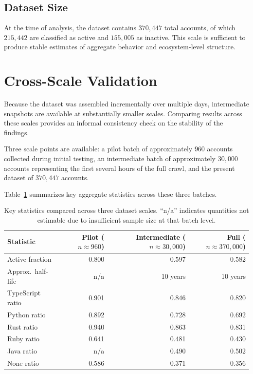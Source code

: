 \documentclass[12pt,a4paper]{article}
\begin{document}
\subsection{Dataset Size}

At the time of analysis, the dataset contains $370{,}447$ total accounts, of which $215{,}442$ are classified as active and $155{,}005$ as inactive. This scale is sufficient to produce stable estimates of aggregate behavior and ecosystem-level structure.

\section{Cross-Scale Validation}
\label{sec:crossscale}

Because the dataset was assembled incrementally over multiple days, intermediate snapshots are available at substantially smaller scales. Comparing results across these scales provides an informal consistency check on the stability of the findings.

Three scale points are available: a pilot batch of approximately $960$ accounts collected during initial testing, an intermediate batch of approximately $30{,}000$ accounts representing the first several hours of the full crawl, and the present dataset of $370{,}447$ accounts.

Table~\ref{tab:crossscale} summarizes key aggregate statistics across these three batches.

\begin{table}[h]
\centering
\begin{tabular}{lrrr}
\toprule
Statistic & Pilot ($n \approx 960$) & Intermediate ($n \approx 30{,}000$) & Full ($n \approx 370{,}000$) \\
\midrule
Active fraction       & 0.800 & 0.597 & 0.582 \\
Approx.\ half-life    & n/a   & 10 years & 10 years \\
TypeScript ratio      & 0.901 & 0.846 & 0.820 \\
Python ratio          & 0.892 & 0.728 & 0.692 \\
Rust ratio            & 0.940 & 0.863 & 0.831 \\
Ruby ratio            & 0.641 & 0.481 & 0.430 \\
Java ratio            & n/a   & 0.490 & 0.502 \\
None ratio            & 0.586 & 0.371 & 0.356 \\
\bottomrule
\end{tabular}
\caption{Key statistics compared across three dataset scales. ``n/a'' indicates quantities not estimable due to insufficient sample size at that batch level.}
\label{tab:crossscale}
\end{table}
\end{document}
